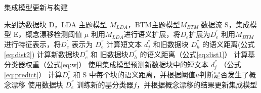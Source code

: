 
  \begin{algorithm}[H]
	\renewcommand{\algorithmicrequire}{\textbf{输入:}}
	\renewcommand{\algorithmicensure}{\textbf{输出:}}
	\caption{集成模型更新与构建}
	\label{alg:ensemble}
	\begin{algorithmic}[1]

		\REQUIRE 未到达数据块 D，LDA 主题模型 $M_{LDA}$，BTM主题模型$M_{BTM}$
		\ENSURE 数据流 S，集成模型 E，概念漂移检测阈值 $\mu$
		\STATE 利用$M_{LDA}$进行语义扩展，将$D_e$扩展为$D_e^{'}$
		\STATE 利用$M_{BTM}$进行特征表示，将$D_e^{'}$ 表示为 $D_e^{''}$
        \STATE  计算短文本 $d_j^{''}$ 和旧数据块 $D_h^{''}$ 的语义距离(公式\ref{eq:dist2})
        \ENDFOR
        \STATE 计算新数据块$D_e^{''}$ 和 旧数据块$D_h^{''}$ 的语义距离（公式\ref{eq:dist1}）
         \ENDFOR
          \STATE 计算基分类器权重（公式\ref{eq:w}）          
          \STATE  使用集成模型预测新数据块中的短文本 $d_j^{''}$ （公式\ref{eq:predict}）
          \ENDFOR
          \STATE 计算$D_e^{''}$ 和 S 中每个块的语义距离，并根据阈值$u$判断是否发生了概念漂移
          \STATE 使用数据块 $D_e^{''}$ 训练新的基分类器$f$，并根据概念漂移的结果更新集成模型
		\ENDFOR
	\end{algorithmic}  
  \end{algorithm}



